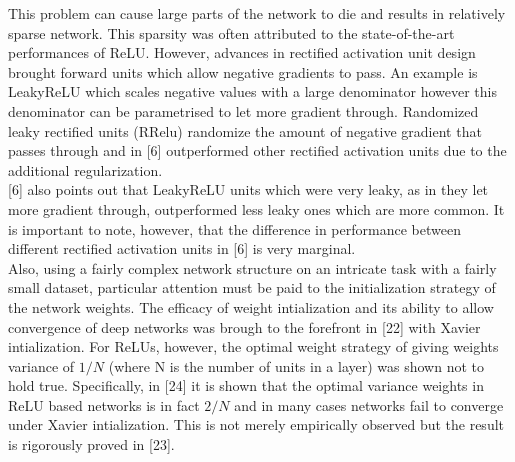 \documentclass{article}
\begin{document}
This problem can cause large parts of the network to die and results in relatively sparse network. This sparsity was often attributed to the state-of-the-art performances of ReLU. However, advances in rectified activation unit design brought forward units which allow negative gradients to pass. An example is LeakyReLU which scales negative values with a large denominator however this denominator can be parametrised to let more gradient through. Randomized leaky rectified units (RRelu) randomize the amount of negative gradient that passes through and in [6] outperformed other rectified activation units due to the additional regularization.\\

[6] also points out that LeakyReLU units which were very leaky, as in they let more gradient through, outperformed less leaky ones which are more common. It is important to note, however, that the difference in performance between different rectified activation units in [6] is very marginal.\\

Also, using a fairly complex network structure on an intricate task with a fairly small dataset, particular attention must be paid to the initialization strategy of the network weights. The efficacy of weight intialization and its ability to allow convergence of deep networks was brough to the forefront in [22] with Xavier intialization. For ReLUs, however, the optimal weight strategy of giving weights variance of $1/N$ (where N is the number of units in a layer) was shown not to hold true. Specifically, in [24] it is shown that the optimal variance weights in ReLU based networks is in fact $2/N$ and in many cases networks fail to converge under Xavier intialization. This is not merely empirically observed but the result is rigorously proved in [23].\\
\end{document}
